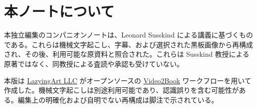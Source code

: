 \documentclass[11pt,oneside]{book}
\begin{document}
\frontmatter
\hypersetup{pageanchor=false}

\hypersetup{pageanchor=true}

\clearpage
\chapter*{本ノートについて}
本独立編集のコンパニオンノートは、Leonard Susskind による講義に基づくものである。これらは機械文字起こし、字幕、および選択された黒板画像から再構成され、その後、利用可能な原資料と照合された。これらは Susskind 教授による原著ではなく、同教授による査読や承認も受けていない。

本版は \href{https://lazying.art}{LazyingArt LLC} がオープンソースの \href{https://github.com/lachlanchen/Video2Book}{Video2Book} ワークフローを用いて作成した。機械文字起こしは別途利用可能であり、認識誤りを含む可能性がある。編集上の明確化および自明でない再構成は脚注で示されている。
\clearpage
\tableofcontents
\mainmatter










\end{document}
